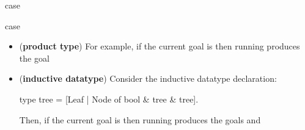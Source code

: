 \begin{tactic}{case}
\begin{tsyntax}{case}
\begin{itemize}
    \item (\textbf{product type})
    For example, if the current goal is
     then
    running 
    produces the goal

    \item (\textbf{inductive datatype})
    Consider the inductive datatype declaration:
\begin{easycrypt}{}{}
type tree = [Leaf | Node of bool & tree & tree].
\end{easycrypt}
    Then, if the current goal is
     then
    running 
    produces the goals
    and
    \end{itemize}
  \end{tsyntax}
\end{tactic}
